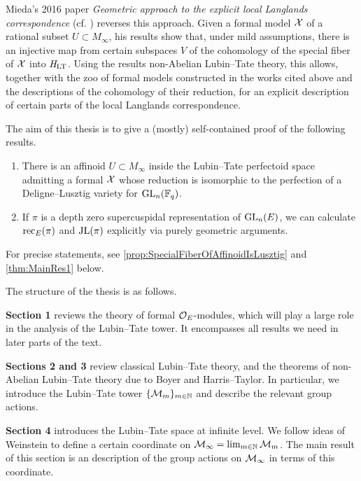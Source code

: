 \documentclass[../main.tex]{subfiles}
\begin{document}
Mieda's 2016 paper \textit{Geometric
  approach to the explicit local Langlands correspondence} (cf.
  \cite{mieda2016geometric}) reverses this approach. Given a formal model $\mathcal{X}$ of a
  rational subset $U \subset M_\infty$, his results show that, under
mild assumptions, there is an injective map
from certain subspaces $V$ of the cohomology of the 
special fiber of $\mathcal{X}$ into $\mathit H_{\mathrm{LT}}$. Using the results non-Abelian
Lubin--Tate theory, this allows, together with the zoo of formal models
constructed in the works cited above and the descriptions of the cohomology of their
reduction, for an explicit description of certain parts of the local Langlands
correspondence.

The aim of this thesis is to give a (mostly) self-contained proof of
the following results.
\begin{thm*}
  \leavevmode \begin{enumerate}
    \item There is an affinoid $U \subset M_\infty$ inside the Lubin--Tate perfectoid
      space admitting a formal $\mathcal{X}$ whose reduction is isomorphic to the
      perfection of a Deligne--Lusztig variety for $\operatorname{GL}_n(\mathbb{F}_q)$.
    \item If $\pi$ is a depth zero supercuspidal representation of $\operatorname{GL}_n(E)$, 
      we can calculate $\mathrm{rec}_E(\pi)$ and $\mathrm{JL}(\pi)$ explicitly via purely geometric
      arguments.
  \end{enumerate}
\end{thm*}
For precise statements, see \cref{prop:SpecialFiberOfAffinoidIsLusztig}
and \cref{thm:MainRes1} below. 

The structure of the thesis is as follows.

\textbf{Section 1} reviews the theory of formal $\mathcal{O}_E$-modules, which
will play a large role in the analysis of the Lubin--Tate tower. It encompasses
all results we need in later parts of the text.

\textbf{Sections 2 and 3} review classical Lubin--Tate theory, and the theorems
of non-Abelian Lubin--Tate theory due to Boyer and Harris--Taylor. In particular,
we introduce the Lubin--Tate tower $\{\mathcal{M}_m\}_{m \in \mathbb{N}}$ and describe the
relevant group actions.

\textbf{Section 4} introduces the Lubin--Tate space at infinite level. 
We follow ideas of Weinstein to define a certain coordinate on $\mathcal{M}_\infty = 
\lim_{m \in \mathbb{N}} \mathcal{M}_m$. The main result of this section is an description of
the group actions on $\mathcal{M}_\infty$ in terms of this coordinate. 
\end{document}
